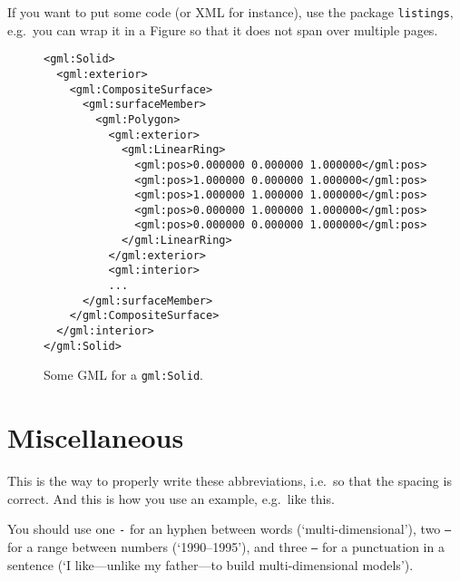 \documentclass[a4paper,11pt,parskip=half]{scrartcl}
\newcommand{\ie}{i.e.}
\newcommand{\eg}{e.g.}
\begin{document}
If you want to put some code (or XML for instance), use the package \texttt{listings}, \eg\ you can wrap it in a Figure so that it does not span over multiple pages.
\begin{figure}
\begin{footnotesize}
\begin{lstlisting}
<gml:Solid>
  <gml:exterior>
    <gml:CompositeSurface>
      <gml:surfaceMember>
        <gml:Polygon>
          <gml:exterior>
            <gml:LinearRing>
              <gml:pos>0.000000 0.000000 1.000000</gml:pos>
              <gml:pos>1.000000 0.000000 1.000000</gml:pos>
              <gml:pos>1.000000 1.000000 1.000000</gml:pos>
              <gml:pos>0.000000 1.000000 1.000000</gml:pos>
              <gml:pos>0.000000 0.000000 1.000000</gml:pos>
            </gml:LinearRing>
          </gml:exterior>
          <gml:interior>
          ...
      </gml:surfaceMember>
    </gml:CompositeSurface>
  </gml:interior>
</gml:Solid>
\end{lstlisting}
\end{footnotesize}
\caption{Some GML for a \texttt{gml:Solid}.}%
\label{fig:codegml}
\end{figure}


%
\section{Miscellaneous}%
\label{sec:misc}


This is the way to properly write these abbreviations, \ie\ so that the spacing is correct.
And this is how you use an example, \eg\ like this.

You should use one \texttt{-} for an hyphen between words (`multi-dimensional'), two \texttt{--} for a range between numbers (`1990--1995'), and three \texttt{---} for a punctuation in a sentence (`I like---unlike my father---to build multi-dimensional models').




\end{document}
